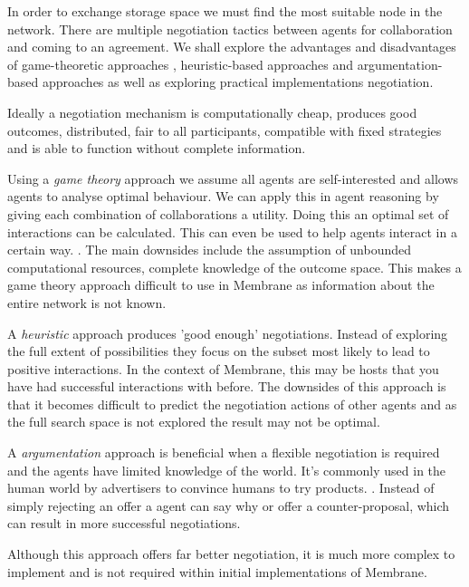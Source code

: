 \documentclass[11pt, a4paper, twocolumn, twoside]{report}
\begin{document}
In order to exchange storage space we must find the most suitable node in the network. There are multiple negotiation tactics between agents for collaboration and coming to an agreement. \citep{beer1999negotiation} We shall explore the advantages and disadvantages of game-theoretic approaches \citep*{rosenschein1994rules, kraus2001strategic, sandholm2002algorithm}, heuristic-based approaches \citep*{faratin2000automated, fatima2002multi} and argumentation-based approaches \citep*{kraus1998reaching, jennings1998argumentation} as well as exploring practical implementations negotiation.

Ideally a negotiation mechanism is computationally cheap, produces good outcomes, distributed, fair to all participants, compatible with fixed strategies and is able to function without complete information. \citep{rahwan2005interest}

Using a \emph{game theory} approach we assume all agents are self-interested and allows agents to analyse optimal behaviour. \citep{osborne1994course} We can apply this in agent reasoning by giving each combination of collaborations a utility. Doing this an optimal set of interactions can be calculated. This can even be used to help agents interact in a certain way. \citep{varian1995economic}. The main downsides include the assumption of unbounded computational resources, complete knowledge of the outcome space. \citep{rahwan2005interest} This makes a game theory approach difficult to use in Membrane as information about the entire network is not known.

A \emph{heuristic} approach produces 'good enough' negotiations. Instead of exploring the full extent of possibilities they focus on the subset most likely to lead to positive interactions. In the context of Membrane, this may be hosts that you have had successful interactions with before. The downsides of this approach is that it becomes difficult to predict the negotiation actions of other agents and as the full search space is not explored the result may not be optimal. \citep{jennings2001automated}

A \emph{argumentation} approach is beneficial when a flexible negotiation is required and the agents have limited knowledge of the world. It's commonly used in the human world by advertisers to convince humans to try products. \citep{slade2002reasons}. Instead of simply rejecting an offer a agent can say why or offer a counter-proposal, which can result in more successful negotiations.

Although this approach offers far better negotiation, it is much more complex to implement and is not required within initial implementations of Membrane.
\end{document}
